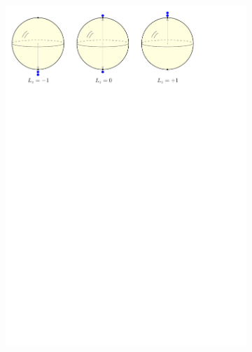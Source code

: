 \documentclass[final,3p,mathptmx]{elsarticle}
\begin{document}
\begin{figure}[h]
	\begin{subfigure}{0.6\textwidth}
		\includegraphics[width=\textwidth, keepaspectratio]{figures/majorana_spin1.pdf}
		\label{fig:bloch:spin1}
	\end{subfigure}
	\caption{}
	\label{fig:bloch}
\end{figure}
\end{document}
